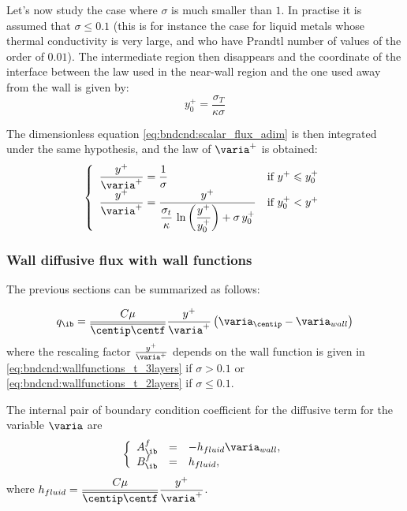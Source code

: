 Let's now study the case where  $\sigma$ is much smaller than $1$.
In practise it is assumed that $\sigma \leqslant 0.1$ (this is for
instance the case for liquid metals whose thermal conductivity is very
large, and who have Prandtl number of values of the order of $0.01$).
The intermediate region then disappears and the coordinate of the
interface between the law used in the near-wall region and the one
used away from the wall is given by:
\begin{equation}
y^+_0= \displaystyle\frac{\sigma_T}{\kappa\sigma}
\end{equation}

The dimensionless equation \eqref{eq:bndcnd:scalar_flux_adim}
is then integrated under the same hypothesis, and the law of
 $\varia^+$ is obtained:
\begin{equation}\label{eq:bndcnd:wallfunctions_t_2layers}
\left\{
\begin{array}{ll}
\dfrac{y^+}{\varia^+} = \dfrac{1}{\sigma} & \text{if } y^+ \leqslant y^+_0 \\
\dfrac{y^+}{\varia^+} = \dfrac{y^+}{\displaystyle\frac{\sigma_t}{\kappa}\,
        \ln\left(\displaystyle\frac{y^+}{y^+_0}\right)+\sigma \,y^+_0}
                   & \text{if } y^+_0 < y^+
\end{array}
\right.
\end{equation}

\subsubsection{Wall diffusive flux with wall functions}
The previous sections can be summarized as follows:

\begin{equation}
q_\ib = \dfrac{C \mu}{\overline{\centip \centf} } \dfrac{y^+}{\varia^+} \left(\varia_\centip - \varia_{wall} \right)
\end{equation}
%
where the rescaling factor $\frac{y^+}{\varia^+}$ depends on the wall function is given in \eqref{eq:bndcnd:wallfunctions_t_3layers} if $\sigma >0.1$ or \eqref{eq:bndcnd:wallfunctions_t_2layers} if $\sigma \leq 0.1$.

The internal pair of boundary condition coefficient for the diffusive term for the variable $\varia $ are
\begin{equation}
\left\lbrace
\begin{array}{r c l}
A^f_\ib & = & -h_{fluid} \varia_{wall}, \\
B^f_\ib & = & h_{fluid},
\end{array}
\right.
\end{equation}
where $h_{fluid} = \dfrac{C \mu}{\overline{\centip \centf} } \dfrac{y^+}{\varia^+} $.

